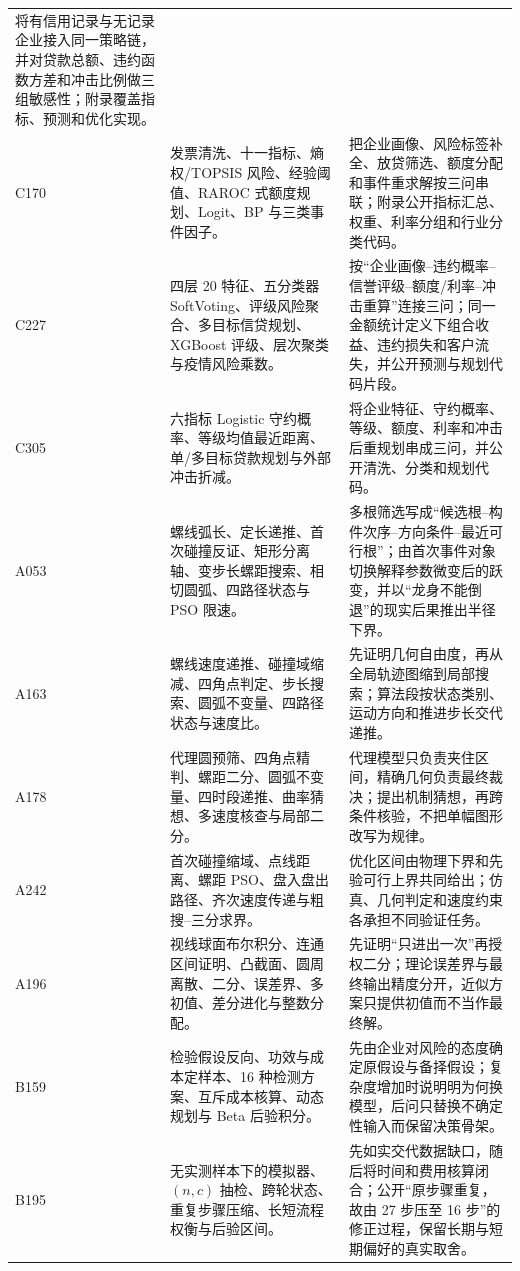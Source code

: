 \begin{longtable}{p{1.4cm}p{5.2cm}p{7.0cm}}
将有信用记录与无记录企业接入同一策略链，并对贷款总额、违约函数方差和冲击比例做三组敏感性；附录覆盖指标、预测和优化实现。\\
C170 & 发票清洗、十一指标、熵权/TOPSIS 风险、经验阈值、RAROC 式额度规划、Logit、BP 与三类事件因子。 &
把企业画像、风险标签补全、放贷筛选、额度分配和事件重求解按三问串联；附录公开指标汇总、权重、利率分组和行业分类代码。\\
C227 & 四层 20 特征、五分类器 SoftVoting、评级风险聚合、多目标信贷规划、XGBoost 评级、层次聚类与疫情风险乘数。 &
按“企业画像--违约概率--信誉评级--额度/利率--冲击重算”连接三问；同一金额统计定义下组合收益、违约损失和客户流失，并公开预测与规划代码片段。\\
C305 & 六指标 Logistic 守约概率、等级均值最近距离、单/多目标贷款规划与外部冲击折减。 &
将企业特征、守约概率、等级、额度、利率和冲击后重规划串成三问，并公开清洗、分类和规划代码。\\
A053 & 螺线弧长、定长递推、首次碰撞反证、矩形分离轴、变步长螺距搜索、相切圆弧、四路径状态与 PSO 限速。 &
多根筛选写成“候选根--构件次序--方向条件--最近可行根”；由首次事件对象切换解释参数微变后的跃变，并以“龙身不能倒退”的现实后果推出半径下界。\\
A163 & 螺线速度递推、碰撞域缩减、四角点判定、步长搜索、圆弧不变量、四路径状态与速度比。 &
先证明几何自由度，再从全局轨迹图缩到局部搜索；算法段按状态类别、运动方向和推进步长交代递推。\\
A178 & 代理圆预筛、四角点精判、螺距二分、圆弧不变量、四时段递推、曲率猜想、多速度核查与局部二分。 &
代理模型只负责夹住区间，精确几何负责最终裁决；提出机制猜想，再跨条件核验，不把单幅图形改写为规律。\\
A242 & 首次碰撞缩域、点线距离、螺距 PSO、盘入盘出路径、齐次速度传递与粗搜--三分求界。 &
优化区间由物理下界和先验可行上界共同给出；仿真、几何判定和速度约束各承担不同验证任务。\\
A196 & 视线球面布尔积分、连通区间证明、凸截面、圆周离散、二分、误差界、多初值、差分进化与整数分配。 &
先证明“只进出一次”再授权二分；理论误差界与最终输出精度分开，近似方案只提供初值而不当作最终解。\\
B159 & 检验假设反向、功效与成本定样本、16 种检测方案、互斥成本核算、动态规划与 Beta 后验积分。 &
先由企业对风险的态度确定原假设与备择假设；复杂度增加时说明明为何换模型，后问只替换不确定性输入而保留决策骨架。\\
B195 & 无实测样本下的模拟器、$(n,c)$ 抽检、跨轮状态、重复步骤压缩、长短流程权衡与后验区间。 &
先如实交代数据缺口，随后将时间和费用核算闭合；公开“原步骤重复，故由 27 步压至 16 步”的修正过程，保留长期与短期偏好的真实取舍。\\

\end{longtable}
